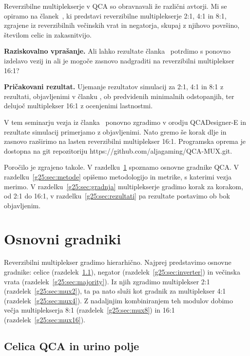 \documentclass[graybox, envcountchap]{svmult}
\begin{document}
Reverzibilne multiplekserje v QCA so obravnavali že različni avtorji. Mi se opiramo na članek~\cite{alharbi2024}, ki predstavi reverzibilne multiplekserje 2:1, 4:1 in 8:1, zgrajene iz reverzibilnih večinskih vrat in negatorja, skupaj z njihovo površino, številom celic in zakasnitvijo.

\begin{svgraybox}
\textbf{Raziskovalno vprašanje.} Ali lahko rezultate članka~\cite{alharbi2024}
potrdimo s ponovno izdelavo vezij in ali je mogoče zasnovo nadgraditi na
reverzibilni multiplekser 16:1?

\textbf{Pričakovani rezultat.} Ujemanje rezultatov simulacij za 2:1, 4:1 in 8:1
z rezultati, objavljenimi v članku \cite{alharbi2024}, ob predvidenih minimalnih odstopanjih, ter
delujoč multiplekser 16:1 z ocenjenimi lastnostmi.
\end{svgraybox}

V tem seminarju vezja iz članka~\cite{alharbi2024} ponovno zgradimo v orodju QCADesigner-E in rezultate simulacij primerjamo z objavljenimi. Nato gremo še korak dlje in zasnovo razširimo na lasten reverzibilni multiplekser 16:1. Programska oprema je dostopna na git repozitoriju https://github.com/aljagaming/QCA-MUX.git.

Poročilo je zgrajeno takole. V razdelku~\ref{g25:sec:gradniki} spoznamo osnovne gradnike QCA. V razdelku~\ref{g25:sec:metode} opišemo metodologijo in metrike, s katerimi vezja merimo. V razdelku~\ref{g25:sec:gradnja} multiplekserje gradimo korak za korakom, od 2:1 do 16:1, v razdelku~\ref{g25:sec:rezultati} pa rezultate postavimo ob bok objavljenim.

\section{Osnovni gradniki}
\label{g25:sec:gradniki}

Reverzibilni multiplekser gradimo hierarhično. Najprej predstavimo osnovne gradnike: celice (razdelek~\ref{g25:sec:celica}), negator (razdelek~\ref{g25:sec:inverter}) in večinska vrata (razdelek~\ref{g25:sec:majority}). Iz njih zgradimo multiplekser 2:1 (razdelek~\ref{g25:sec:mux2}), ta pa nato služi kot gradnik za multiplekser 4:1 (razdelek~\ref{g25:sec:mux4}). Z nadaljnjim kombiniranjem teh modulov dobimo večja multiplekserja 8:1 (razdelek~\ref{g25:sec:mux8}) in 16:1 (razdelek~\ref{g25:sec:mux16}).

\subsection{Celica QCA in urino polje}
\label{g25:sec:celica}
\end{document}
